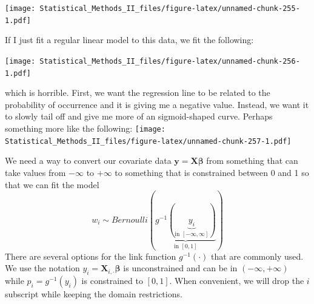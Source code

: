 \documentclass[]{book}
\newenvironment{Shaded}{\begin{snugshade}}{\end{snugshade}}
\newcommand{\KeywordTok}[1]{\textcolor[rgb]{0.13,0.29,0.53}{\textbf{{#1}}}}
\newcommand{\DataTypeTok}[1]{\textcolor[rgb]{0.13,0.29,0.53}{{#1}}}
\newcommand{\StringTok}[1]{\textcolor[rgb]{0.31,0.60,0.02}{{#1}}}
\newcommand{\NormalTok}[1]{{#1}}
\theoremstyle{definition}
\theoremstyle{definition}
\theoremstyle{remark}
\begin{document}
\texttt{[image: Statistical\_Methods\_II\_files/figure-latex/unnamed-chunk-255-1.pdf]}

If I just fit a regular linear model to this data, we fit the following:

\begin{Shaded}
\end{Shaded}

\texttt{[image: Statistical\_Methods\_II\_files/figure-latex/unnamed-chunk-256-1.pdf]}

which is horrible. First, we want the regression line to be related to
the probability of occurrence and it is giving me a negative value.
Instead, we want it to slowly tail off and give me more of an
sigmoid-shaped curve. Perhaps something more like the following:
\texttt{[image: Statistical\_Methods\_II\_files/figure-latex/unnamed-chunk-257-1.pdf]}

We need a way to convert our covariate data
\(\boldsymbol{y}=\boldsymbol{X\beta}\) from something that can take
values from \(-\infty\) to \(+\infty\) to something that is constrained
between 0 and 1 so that we can fit the model
\[w_{i}\sim Bernoulli\left(\underset{\textrm{in }[0,1]}{\underbrace{g^{-1}\left(\underset{\textrm{in }\left[-\infty,\infty\right]}{\underbrace{y_{i}}}\right)}}\right)\]
There are several options for the link function
\(g^{-1}\left(\cdot\right)\) that are commonly used. We use the notation
\(y_{i}=\boldsymbol{X}_{i,\cdot}\boldsymbol{\beta}\) is unconstrained
and can be in \(\left(-\infty, +\infty\right)\) while
\(p_{i}=g^{-1}\left(y_{i}\right)\) is constrained to
\(\left[0,1\right]\). When convenient, we will drop the \(i\) subscript
while keeping the domain restrictions.
\end{document}
